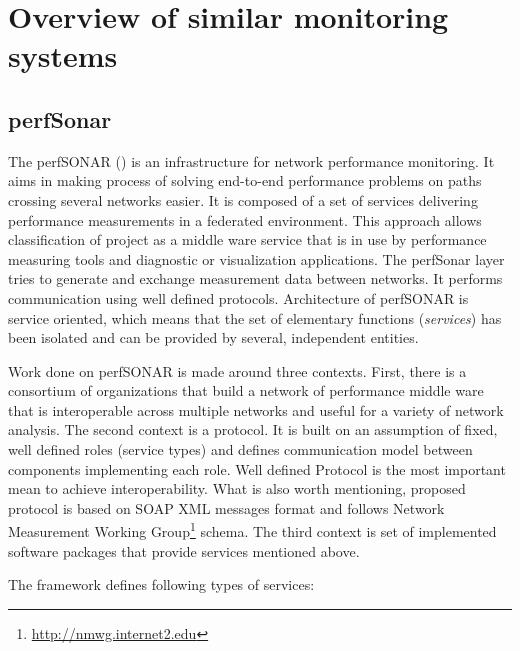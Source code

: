 
\section{Overview of similar monitoring systems} \label{sec:ch2_similar}


\subsection{perfSonar}

The perfSONAR (\cite{perfSonar1,perfSonar2,perfSonar3}) is an infrastructure for network performance monitoring. It aims in making process of solving end-to-end performance problems on paths crossing several networks easier. It is composed of a set of services delivering performance measurements in a federated environment. This approach allows classification of project as a middle ware service that is in use by performance measuring tools and diagnostic or visualization applications. The perfSonar layer tries to generate and exchange measurement data between networks. It performs communication using well defined protocols. Architecture of perfSONAR is service oriented, which means that the set of elementary functions (\emph{services}) has been isolated and can be provided by several, independent entities.

Work done on perfSONAR is made around three contexts. First, there is a consortium of organizations that build a network of performance middle ware that is interoperable across multiple networks and useful for a variety of network analysis. The second context is a protocol. It is built on an assumption of fixed, well defined roles (service types) and defines communication model between components implementing each role. Well defined Protocol is the most important mean to achieve interoperability. What is also worth mentioning, proposed protocol is based on SOAP XML messages format and follows Network Measurement Working Group\footnote{\url{http://nmwg.internet2.edu}} schema. The third context is set of implemented software packages that provide services mentioned above.

The framework defines following types of services:

